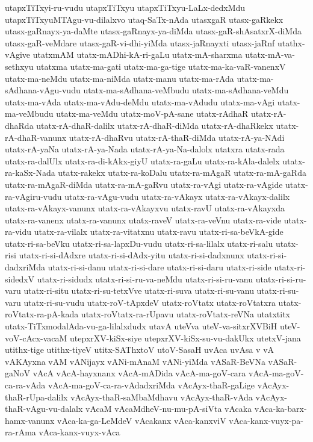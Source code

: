{utapxTiTxyi-ru-vudu
utapxTiTxyu
utapxTiTxyu-LaLx-dedxMdu
utapxTiTxyuMTAgu-vu-dilalxvo
utaq-SaTx-nAda
utasxgaR
utasx-gaRkekx
utasx-gaRnayx-ya-daMte
utasx-gaRnayx-ya-diMda
utasx-gaR-shAsatxrX-diMda
utasx-gaR-veMdare
utasx-gaR-vi-dhi-yiMda
utasx-jaRnayxti
utasx-jaRnf
utathx-vAgive
utatxmAM
utatx-mADhi-kA-ri-gaLu
utatx-mA-sharxma
utatx-mA-va-sethxyu
utatxma
utatx-ma-gati
utatx-ma-ga-tige
utatx-ma-ka-vaR-vanenxV
utatx-ma-neMdu
utatx-ma-niMda
utatx-manu
utatx-ma-rAda
utatx-ma-sAdhana-vAgu-vudu
utatx-ma-sAdhana-veMbudu
utatx-ma-sAdhana-veMdu
utatx-ma-vAda
utatx-ma-vAdu-deMdu
utatx-ma-vAdudu
utatx-ma-vAgi
utatx-ma-veMbudu
utatx-ma-veMdu
utatx-moV-pA-sane
utatx-rAdhaR
utatx-rA-dhaRda
utatx-rA-dhaR-dalilx
utatx-rA-dhaR-diMda
utatx-rA-dhaRkekx
utatx-rA-dhaR-vanunx
utatx-rA-dhaRvu
utatx-rA-thaR-diMda
utatx-rA-ya-NAdi
utatx-rA-yaNa
utatx-rA-ya-Nada
utatx-rA-ya-Na-dalolx
utatxra
utatx-rada
utatx-ra-dalUlx
utatx-ra-di-kAkx-giyU
utatx-ra-gaLu
utatx-ra-kAla-dalelx
utatx-ra-kaSx-Nada
utatx-rakekx
utatx-ra-koDalu
utatx-ra-mAgaR
utatx-ra-mA-gaRda
utatx-ra-mAgaR-diMda
utatx-ra-mA-gaRvu
utatx-ra-vAgi
utatx-ra-vAgide
utatx-ra-vAgiru-vudu
utatx-ra-vAgu-vudu
utatx-ra-vAkayx
utatx-ra-vAkayx-dalilx
utatx-ra-vAkayx-vanunx
utatx-ra-vAkayxvu
utatx-ravU
utatx-ra-vAkayxda
utatx-ra-vanenx
utatx-ra-vanunx
utatx-raveV
utatx-ra-veVnu
utatx-ra-vide
utatx-ra-vidu
utatx-ra-vilalx
utatx-ra-vitatxnu
utatx-ravu
utatx-ri-sa-beVkA-gide
utatx-ri-sa-beVku
utatx-ri-sa-lapxDu-vudu
utatx-ri-sa-lilalx
utatx-ri-salu
utatx-risi
utatx-ri-si-dAdxre
utatx-ri-si-dAdx-yitu
utatx-ri-si-dadxnunx
utatx-ri-si-dadxriMda
utatx-ri-si-danu
utatx-ri-si-dare
utatx-ri-si-daru
utatx-ri-side
utatx-ri-sidedxV
utatx-ri-sidudx
utatx-ri-si-ru-va-neMdu
utatx-ri-si-ru-vanu
utatx-ri-si-ru-varu
utatx-ri-situ
utatx-ri-su-tetxVve
utatx-ri-suva
utatx-ri-su-vanu
utatx-ri-su-varu
utatx-ri-su-vudu
utatx-roV-tApxdeV
utatx-roVtatx
utatx-roVtatxra
utatx-roVtatx-ra-pA-kada
utatx-roVtatx-ra-rUpavu
utatx-roVtatx-reVNa
utatxtitx
utatx-TiTxmodalAda-vu-ga-lilalxdudx
utavA
uteVva
uteV-va-sitxrXVBiH
uteV-voV-cAcx-vacaM
utepxrXV-kiSx-siye
utepxrXV-kiSx-su-vu-dakUkx
utetxV-jana
utithx-tige
utithx-tiyeV
utitx-SAThxtoV
utoV-SasaH
uvAca
uvAsa
v
vA
vAKAyxna
vAM
vANijayx
vANi-mAnaM
vANi-yiMda
vASaR-BeVNa
vASaR-gaNoV
vAcA
vAcA-hayxnanx
vAcA-mADida
vAcA-ma-goV-cara
vAcA-ma-goV-ca-ra-vAda
vAcA-ma-goV-ca-ra-vAdadxriMda
vAcAyx-thaR-gaLige
vAcAyx-thaR-rUpa-dalilx
vAcAyx-thaR-saMbaMdhavu
vAcAyx-thaR-vAda
vAcAyx-thaR-vAgu-vu-dalalx
vAcaM
vAcaMdheV-nu-mu-pA-siVta
vAcaka
vAca-ka-barx-hamx-vanunx
vAca-ka-ga-LeMdeV
vAcakanx
vAca-kanxviV
vAca-kanx-vuyx-pa-ra-rAma
vAca-kanx-vuyx-vAca
}
